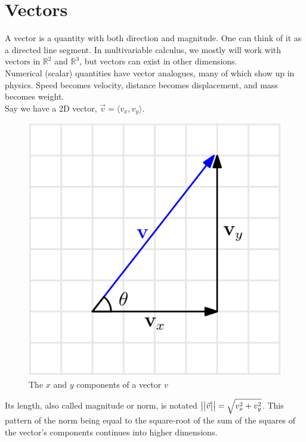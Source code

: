 \section{Vectors}
\noindent
A vector is a quantity with both direction and magnitude.
One can think of it as a directed line segment.
In multivariable calculus, we mostly will work with vectors in $\mathbb{R}^2$ and $\mathbb{R}^3$, but vectors can exist in other dimensions.\\

\noindent
Numerical (scalar) quantities have vector analogues, many of which show up in physics.
Speed becomes velocity, distance becomes displacement, and mass becomes weight.\\

\noindent
Say we have a 2D vector, $\vec{v} = \langle v_x, v_y \rangle$.

\begin{figure}[H]
	\centering
	\includegraphics[scale=0.5]{./Images/backgroundReview/VectorAddition.png}
	\caption{The $x$ and $y$ components of a vector $v$}
\end{figure}

\noindent
Its length, also called magnitude or norm, is notated $\big\lvert \big\lvert \vec{v} \big\rvert \big\rvert = \sqrt{v_x^2+v_y^2}$.
This pattern of the norm being equal to the square-root of the sum of the squares of the vector's components continues into higher dimensions.\\

